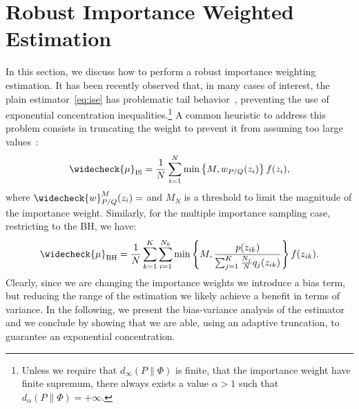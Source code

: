 \documentclass{article}
\begin{document}
\section{Robust Importance Weighted Estimation}\label{sec:robust}
In this section, we discuss how to perform a robust importance weighting estimation. It has been recently observed that, in many cases of interest, the plain estimator~\eqref{eq:ise} has problematic tail behavior~\cite{metelli2018policy}, preventing the use of exponential concentration inequalities.\footnote{Unless we require that $d_{\infty}(P \| \Phi)$ is finite, \ie that the importance weight have finite supremum, there always exists a value $\alpha>1$ such that $d_{\alpha}(P \| \Phi)=+\infty$.} A common heuristic to address this problem consists in truncating the weight to prevent it from assuming too large values~\cite{ionides2008truncated}:
\begin{align}\label{eq:truncatedise}
	\widecheck{\mu}_{\text{IS}} = \frac{1}{N}\sum_{i=1}^{N} \min \left\{ M, {w}_{P/Q}(z_i) \right\} f(z_i),
\end{align}
where $\widecheck{w}_{P/Q}^M(z_i) = $ and $M_N$ is a threshold to limit the magnitude of the importance weight. Similarly, for the multiple importance sampling case, restricting to the BH, we have:
\begin{align}\label{eq:truncatedmise}
	\widecheck{\mu}_{\text{BH}} =\frac{1}{N} \sum_{k=1}^K\sum_{i=1}^{N_k} \min \left\{M,  \frac{p(z_{ik})}{\sum_{j=1}^K \frac{N_j}{N} q_j(z_{ik})} \right\} f(z_{ik}).
\end{align}
Clearly, since we are changing the importance weights we introduce a bias term, but reducing the range of the estimation we likely achieve a benefit in terms of variance. In the following, we present the bias-variance analysis of the estimator and we conclude by showing that we are able, using an adaptive truncation, to guarantee an exponential concentration.
\end{document}
